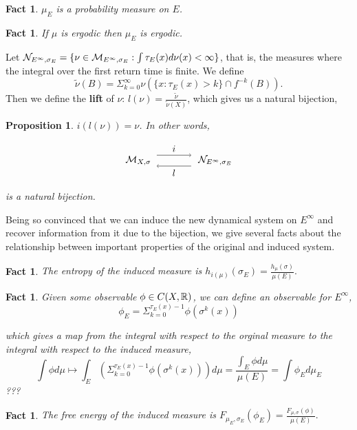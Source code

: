 \documentclass[11pt, reqno]{amsart}
\theoremstyle{plain}
\numberwithin{thm}{subsection}
\newtheorem{prop}[thm]{Proposition}
\newtheorem{fact}[thm]{Fact}
\theoremstyle{definition}
\begin{document}
\begin{fact}
  $\mu_E$ is a probability measure on $E$.
\end{fact}

\begin{fact}
  If $\mu$ is ergodic then $\mu_E$ is ergodic.
\end{fact}

Let $\mathcal{N}_{E^\infty, \sigma_E} = \{\nu \in \mathcal{M}_{E^\infty, \sigma_E} : \int \tau_E(x) d\nu(x) < \infty \}$, that is, the measures where the integral over the first return time is finite. We define $$\tilde{\nu}(B) = \Sigma_{k=0}^{\infty}\nu(\{x : \tau_E(x) > k\} \cap f^{-k}(B)).$$ Then we define the \textbf{lift} of $\nu$: $l(\nu) = \frac{\tilde{\nu}}{\tilde{\nu}(X)}$, which gives us a natural bijection,

\begin{prop}
  $i(l(\nu)) = \nu$. In other words,
  \begin{figure}[H]
    \centering 
    $$\begin{tikzpicture}
      \node (A) at (-1.3, 0)   {$\cM_{X, \sigma}$};
      \node (B) at (1.5, 0)    {$\cN_{E^\infty, \sigma_E}$};
      \node (C) at (-.75, .2)  {};
      \node (D) at (.75, -.2) {};
      \node (E) at (.75, .2)   {};
      \node (F) at (-.75,-.2)  {};
        
      \draw[->] (C) -- node[above] {$i$}      (E);
      \draw[<-] (F) -- node[below] {$l$} (D);
    \end{tikzpicture}$$ 
  \end{figure}
  is a natural bijection.
\end{prop}

Being so convinced that we can induce the new dynamical system on $E^\infty$ and recover information from it due to the bijection, we give several facts about the relationship between important properties of the original and induced system.

\begin{fact}
  The entropy of the induced measure is $h_{i(\mu)}(\sigma_E) = \frac{h_\mu(\sigma)}{\mu(E)}.$
\end{fact}

\begin{fact}
  Given some observable $\phi \in C(X, \mathbb{R})$, we can define an observable for $E^\infty$,
  $$\phi_E = \Sigma_{k=0}^{\tau_E(x)-1}\phi(\sigma^k(x))$$

  which gives a map from the integral with respect to the orginal measure to the integral with respect to the induced measure, 
  $$\int\phi d\mu \mapsto \int_E \left(\Sigma_{k=0}^{\tau_E(x)-1}\phi(\sigma^k(x))\right)d\mu = \frac{\int_E \phi d\mu}{\mu(E)} = \int\phi_E d\mu_E$$
  ???
\end{fact}
\begin{fact}
  The free energy of the induced measure is $F_{\mu_E, \sigma_E}(\phi_E) = \frac{F_{\mu, \sigma}(\phi)}{\mu(E)}.$
\end{fact}
\end{document}
